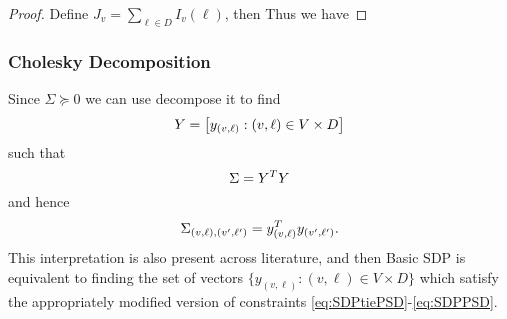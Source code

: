 \begin{proof}
Define $J_v = \sum_{\ell \in D} I_v(\ell)$, then 
Thus we have 
\end{proof}

\subsubsection{Cholesky Decomposition}

Since $\Sigma \succeq 0$ we can use decompose it to find 
$$Y = \left[y_{(v, \ell)}: (v, \ell) \in V \times D\right]$$
such that 
$$\Sigma = Y^T Y$$ and hence $$ \Sigma_{(v, \ell), (v', \ell')} = y_{(v, \ell)}^T y_{(v', \ell')}.$$
This interpretation is also present across literature, and then Basic SDP is equivalent to finding the set of vectors $\{y_{(v, \ell)} : (v, \ell) \in V \times D\}$ which satisfy the appropriately modified version of constraints \ref{eq:SDPtiePSD}-\ref{eq:SDPPSD}.

